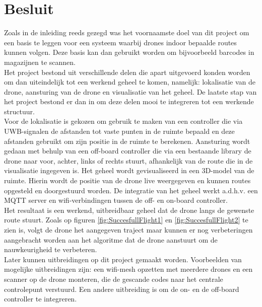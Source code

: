 \chapter*{Besluit}
Zoals in de inleiding reeds gezegd was het voornaamste doel van dit project om een basis te leggen voor een systeem waarbij drones indoor bepaalde routes kunnen volgen. Deze basis kan dan gebruikt worden om bijvoorbeeld barcodes in magazijnen te scannen.\\

Het project bestond uit verschillende delen die apart uitgevoerd konden worden om dan uiteindelijk tot een werkend geheel te komen, namelijk: lokalisatie van de drone, aansturing van de drone en visualisatie van het geheel. De laatste stap van het project bestond er dan in om deze delen mooi te integreren tot een werkende structuur.\\

Voor de lokalisatie is gekozen om gebruik te maken van een controller die via UWB-signalen de afstanden tot vaste punten in de ruimte bepaald en deze afstanden gebruikt om zijn positie in de ruimte te berekenen. Aansturing wordt gedaan met behulp van een off-board controller die via een bestaande library de drone naar voor, achter, links of rechts stuurt, afhankelijk van de route die in de visualisatie ingegeven is. Het geheel wordt gevisualiseerd in een 3D-model van de ruimte. Hierin wordt de positie van de drone live weergegeven en kunnen routes opgesteld en doorgestuurd worden. De integratie van het geheel werkt a.d.h.v. een MQTT server en wifi-verbindingen tussen de off- en on-board controller.\\

Het resultaat is een werkend, uitbreidbaar geheel dat de drone langs de gewenste route stuurt. Zoals op figuren \ref{fig:SuccesfullFlight1} en \ref{fig:SuccesfullFlight2} te zien is, volgt de drone het aangegeven traject maar kunnen er nog verbeteringen aangebracht worden aan het algoritme dat de drone aanstuurt om de nauwkeurigheid te verbeteren.\\

Later kunnen uitbreidingen op dit project gemaakt worden. Voorbeelden van mogelijke uitbreidingen zijn: een wifi-mesh opzetten met meerdere drones en een scanner op de drone monteren, die de gescande codes naar het centrale controlepunt verstuurd. Een andere uitbreiding is om de on- en de off-board controller te integreren.\\